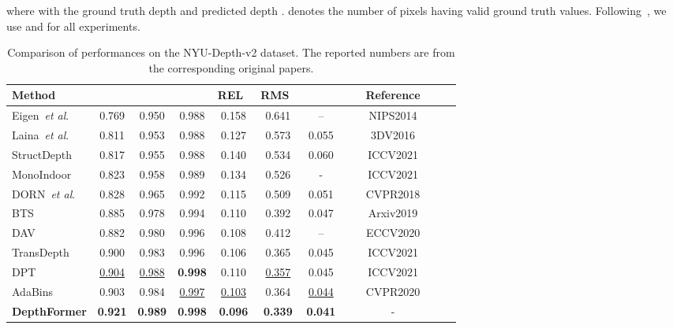 \documentclass[twocolumn]{svjour3}    \pdfoutput=1
\newcommand{\etal}{\textit{et al}. }
\begin{document}
where  with the ground truth depth  and predicted depth .  denotes the number of pixels having valid ground truth values. Following~\citep{bhat2021adabins}, we use  and  for all experiments.


\begin{table*}[t]
    \centering
\begin{tabularx}{0.9\linewidth}{@{}l*{6}{C}cc@{}}
\toprule
            Method        & \textbf{}       & \textbf{}          & \textbf{}~            & REL~          & RMS~  & ~ & ~~~Reference~~~\\ \midrule
            
            Eigen~\etal~\citep{eigen2014depth}& 0.769 & 0.950 & 0.988 & 0.158 & 0.641 & -- & NIPS2014\\
            Laina~\etal~\citep{laina2016deeper}& 0.811 & 0.953 & 0.988 & 0.127 & 0.573 & 0.055 & 3DV2016 \\
            StructDepth~\citep{li2021structdepth} & 0.817 & 0.955 & 0.988 & 0.140 & 0.534 & 0.060 & ICCV2021 \\
            MonoIndoor~\citep{ji2021monoindoor} & 0.823 & 0.958 & 0.989 & 0.134 & 0.526 & - & ICCV2021 \\
            DORN~\etal~\citep{fu2018deep}& 0.828 & 0.965 & 0.992 & 0.115 & 0.509 & 0.051 & CVPR2018 \\
            BTS~\citep{lee2019bts}& 0.885 & 0.978 & 0.994 & 0.110 & 0.392 & 0.047 & Arxiv2019\\
            DAV~\citep{huynh2020guiding}& 0.882 & 0.980 & 0.996 & 0.108 & 0.412 & -- & ECCV2020\\
            TransDepth~\citep{yang2021transdepth}& 0.900 & 0.983 & 0.996 & 0.106 & 0.365 & 0.045 & ICCV2021\\
            DPT~\citep{ranftl2021dpt} & \underline{0.904} & \underline{0.988} & \textbf{0.998} & 0.110 & \underline{0.357} & 0.045 & ICCV2021 \\
            AdaBins~\citep{bhat2021adabins} & 0.903 & 0.984 & \underline{0.997} & \underline{0.103} & 0.364 & \underline{0.044} & CVPR2020 \\
            \midrule
            \textbf{DepthFormer} & \textbf{0.921} & \textbf{0.989} & \textbf{0.998} & \textbf{0.096} & \textbf{0.339} & \textbf{0.041} & -\\
            \bottomrule
\end{tabularx}
\caption{Comparison of performances on the NYU-Depth-v2 dataset. The reported numbers are from the corresponding original papers.}
    \label{tab:results-nyu}
\end{table*}
\end{document}
